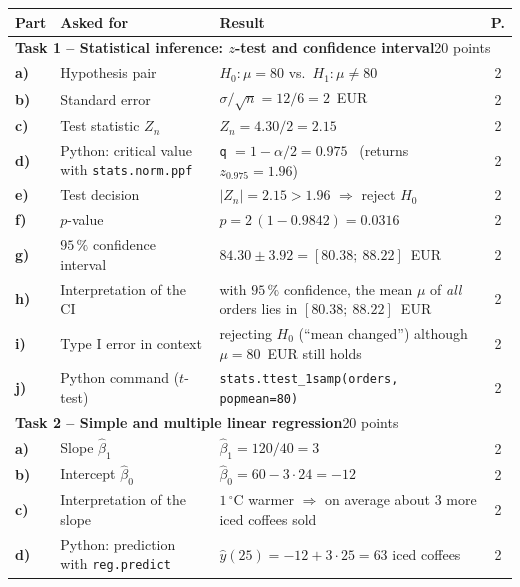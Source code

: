 \documentclass[11pt]{article}
\begin{document}
\begin{footnotesize}
\renewcommand{\arraystretch}{1.0}
\noindent\begin{longtable}{@{}p{0.8cm}>{\raggedright\arraybackslash}p{5.3cm}>{\raggedright\arraybackslash}p{8.4cm}c@{}}
\toprule
\textbf{Part} & \textbf{Asked for} & \textbf{Result} & \textbf{P.}\\
\midrule
\multicolumn{4}{l}{\textbf{Task 1 -- Statistical inference: \texorpdfstring{$z$}{z}-test and confidence interval}\hfill\textnormal{20 points}}\\
\midrule
\textbf{a)} & Hypothesis pair & $H_0\colon \mu = 80$ vs.\ $H_1\colon \mu \neq 80$ & 2\\
\textbf{b)} & Standard error & $\sigma/\sqrt{n} = 12/6 = 2$~EUR & 2\\
\textbf{c)} & Test statistic $Z_n$ & $Z_n = 4.30/2 = 2.15$ & 2\\
\textbf{d)} & Python: critical value with \texttt{stats.norm.ppf} & \texttt{q} $= 1-\alpha/2 = 0.975$ \ (returns $z_{0.975} = 1.96$) & 2\\
\textbf{e)} & Test decision & $|Z_n| = 2.15 > 1.96$ $\Rightarrow$ reject $H_0$ & 2\\
\textbf{f)} & $p$-value & $p = 2\,(1-0.9842) = 0.0316$ & 2\\
\textbf{g)} & $95\,\%$ confidence interval & $84.30 \pm 3.92 = [80.38;\ 88.22]$~EUR & 2\\
\textbf{h)} & Interpretation of the CI & with $95\,\%$ confidence, the mean $\mu$ of \emph{all} orders lies in $[80.38;\ 88.22]$~EUR & 2\\
\textbf{i)} & Type I error in context & rejecting $H_0$ (``mean changed'') although $\mu = 80$~EUR still holds & 2\\
\textbf{j)} & Python command ($t$-test) & \texttt{stats.ttest\_1samp(orders, popmean=80)} & 2\\
\midrule
\multicolumn{4}{l}{\textbf{Task 2 -- Simple and multiple linear regression}\hfill\textnormal{20 points}}\\
\midrule
\textbf{a)} & Slope $\hat\beta_1$ & $\hat\beta_1 = 120/40 = 3$ & 2\\
\textbf{b)} & Intercept $\hat\beta_0$ & $\hat\beta_0 = 60 - 3\cdot 24 = -12$ & 2\\
\textbf{c)} & Interpretation of the slope & $1$\,$^{\circ}$C warmer $\Rightarrow$ on average about $3$ more iced coffees sold & 2\\
\textbf{d)} & Python: prediction with \texttt{reg.predict} & $\hat y(25) = -12 + 3\cdot 25 = 63$ iced coffees & 2\\

\end{longtable}
\end{footnotesize}
\end{document}
